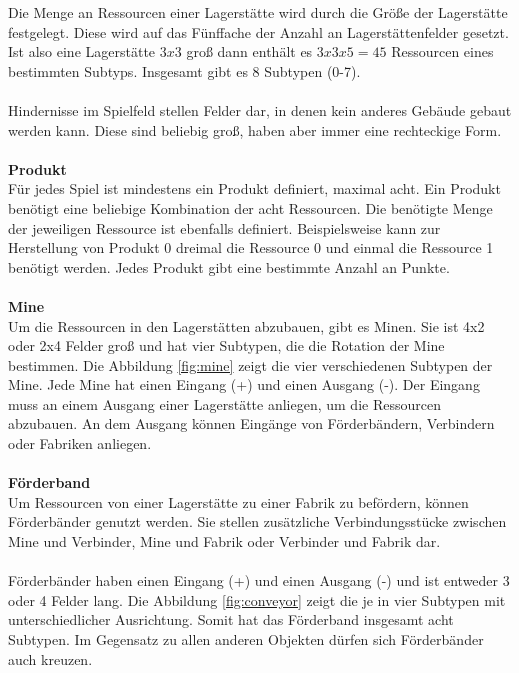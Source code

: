 Die Menge an Ressourcen einer Lagerstätte wird durch die Größe der Lagerstätte festgelegt.  Diese wird  auf das Fünffache der Anzahl an Lagerstättenfelder gesetzt. Ist also eine Lagerstätte $3 x 3$ groß dann enthält es $3x 3 x 5 = 45$ Ressourcen eines bestimmten Subtyps. Insgesamt gibt es 8 Subtypen (0-7).
\\\\
Hindernisse im Spielfeld stellen Felder dar, in denen kein anderes Gebäude gebaut werden kann. Diese sind beliebig groß, haben aber immer eine rechteckige Form. 
\\\\
\textbf{Produkt}\\
Für jedes Spiel ist mindestens ein Produkt definiert, maximal acht. Ein Produkt benötigt eine beliebige Kombination der acht Ressourcen. Die benötigte Menge der jeweiligen Ressource ist ebenfalls definiert. Beispielsweise kann zur Herstellung von Produkt 0 dreimal die Ressource 0 und einmal die Ressource 1 benötigt werden. Jedes Produkt gibt eine bestimmte Anzahl an Punkte.
\\\\
\textbf{Mine}\\
Um die Ressourcen in den Lagerstätten abzubauen, gibt es Minen. Sie ist 4x2 oder 2x4 Felder groß und hat vier Subtypen, die die Rotation der Mine bestimmen. Die Abbildung \ref{fig:mine} zeigt die vier verschiedenen Subtypen der Mine.
Jede Mine hat einen Eingang (+) und einen Ausgang (-). Der Eingang muss an einem Ausgang einer Lagerstätte anliegen, um die Ressourcen abzubauen. An dem Ausgang können Eingänge von Förderbändern, Verbindern oder Fabriken anliegen. 
\\\\
\textbf{Förderband}\\
Um Ressourcen von einer Lagerstätte zu einer Fabrik zu befördern, können Förderbänder genutzt werden. Sie stellen zusätzliche Verbindungsstücke zwischen Mine und Verbinder, Mine und Fabrik oder Verbinder und Fabrik dar.
\\\\
Förderbänder haben einen Eingang (+) und einen Ausgang (-) und ist entweder 3 oder 4 Felder lang. Die Abbildung \ref{fig:conveyor} zeigt die je in vier Subtypen mit unterschiedlicher Ausrichtung. Somit hat das Förderband insgesamt acht Subtypen.
Im Gegensatz zu allen anderen Objekten dürfen sich Förderbänder auch kreuzen.
